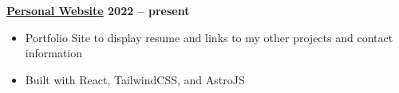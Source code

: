 \textbf{\href{https://russellcorbett.ca/}{Personal Website} \hfill 2022 -- present} \par
\begin{itemize}
	\item Portfolio Site to display resume and links to my other projects and contact information
    \item Built with React, TailwindCSS, and AstroJS
\end{itemize}\vspace{0.1cm}\par